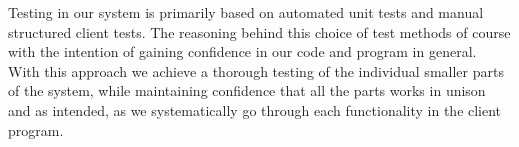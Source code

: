Testing in our system is primarily based on automated unit tests and manual structured client tests. The reasoning behind this choice of test methods of course with the intention of gaining confidence in our code and program in general. With this approach we achieve a thorough testing of the individual smaller parts of the system, while maintaining confidence that all the parts works in unison and as intended, as we systematically go through each functionality in the client program.